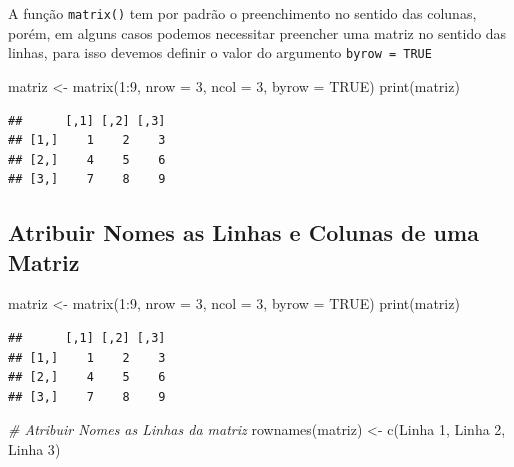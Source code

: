 \documentclass[
]{article}
\newenvironment{Shaded}{\begin{snugshade}}{\end{snugshade}}
\newcommand{\AttributeTok}[1]{\textcolor[rgb]{0.77,0.63,0.00}{#1}}
\newcommand{\CommentTok}[1]{\textcolor[rgb]{0.56,0.35,0.01}{\textit{#1}}}
\newcommand{\ConstantTok}[1]{\textcolor[rgb]{0.00,0.00,0.00}{#1}}
\newcommand{\DecValTok}[1]{\textcolor[rgb]{0.00,0.00,0.81}{#1}}
\newcommand{\FunctionTok}[1]{\textcolor[rgb]{0.00,0.00,0.00}{#1}}
\newcommand{\NormalTok}[1]{#1}
\newcommand{\OtherTok}[1]{\textcolor[rgb]{0.56,0.35,0.01}{#1}}
\newcommand{\SpecialCharTok}[1]{\textcolor[rgb]{0.00,0.00,0.00}{#1}}
\newcommand{\StringTok}[1]{\textcolor[rgb]{0.31,0.60,0.02}{#1}}
\begin{document}
A função \texttt{matrix()} tem por padrão o preenchimento no sentido das
colunas, porém, em alguns casos podemos necessitar preencher uma matriz
no sentido das linhas, para isso devemos definir o valor do argumento
\texttt{byrow\ =\ TRUE}

\begin{Shaded}
\begin{Highlighting}[]
\NormalTok{matriz }\OtherTok{\textless{}{-}} \FunctionTok{matrix}\NormalTok{(}\DecValTok{1}\SpecialCharTok{:}\DecValTok{9}\NormalTok{, }\AttributeTok{nrow =} \DecValTok{3}\NormalTok{, }\AttributeTok{ncol =} \DecValTok{3}\NormalTok{, }\AttributeTok{byrow =} \ConstantTok{TRUE}\NormalTok{)}
\FunctionTok{print}\NormalTok{(matriz)}
\end{Highlighting}
\end{Shaded}

\begin{verbatim}
##      [,1] [,2] [,3]
## [1,]    1    2    3
## [2,]    4    5    6
## [3,]    7    8    9
\end{verbatim}

\hypertarget{atribuir-nomes-as-linhas-e-colunas-de-uma-matriz}{%
\subsection{Atribuir Nomes as Linhas e Colunas de uma
Matriz}\label{atribuir-nomes-as-linhas-e-colunas-de-uma-matriz}}

\begin{Shaded}
\begin{Highlighting}[]
\NormalTok{matriz }\OtherTok{\textless{}{-}} \FunctionTok{matrix}\NormalTok{(}\DecValTok{1}\SpecialCharTok{:}\DecValTok{9}\NormalTok{, }\AttributeTok{nrow =} \DecValTok{3}\NormalTok{, }\AttributeTok{ncol =} \DecValTok{3}\NormalTok{, }\AttributeTok{byrow =} \ConstantTok{TRUE}\NormalTok{)}
\FunctionTok{print}\NormalTok{(matriz)}
\end{Highlighting}
\end{Shaded}

\begin{verbatim}
##      [,1] [,2] [,3]
## [1,]    1    2    3
## [2,]    4    5    6
## [3,]    7    8    9
\end{verbatim}

\begin{Shaded}
\begin{Highlighting}[]
\CommentTok{\# Atribuir Nomes as Linhas da matriz}
\FunctionTok{rownames}\NormalTok{(matriz) }\OtherTok{\textless{}{-}} \FunctionTok{c}\NormalTok{(}\StringTok{\textquotesingle{}Linha 1\textquotesingle{}}\NormalTok{, }\StringTok{\textquotesingle{}Linha 2\textquotesingle{}}\NormalTok{, }\StringTok{\textquotesingle{}Linha 3\textquotesingle{}}\NormalTok{)}
\end{Highlighting}
\end{Shaded}
\end{document}
